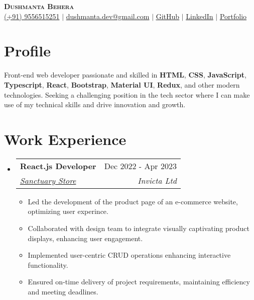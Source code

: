 \documentclass[letterpaper,11pt]{article}
\makeatletter
\newcommand{\resumeItem}[1]{
  \item\small{
    {#1 \vspace{-2pt}}
  }
}
\newcommand{\resumeSubheading}[4]{
  \vspace{-2pt}\item
    \begin{tabular*}{0.97\textwidth}[t]{l@{\extracolsep{\fill}}r}
      \textbf{#1} & #2 \\
      \textit{\small#3} & \textit{\small #4} \\
    \end{tabular*}\vspace{-7pt}
}
\newcommand{\resumeSubHeadingListStart}{\begin{itemize}[leftmargin=0.15in, label={}]}
\newcommand{\resumeSubHeadingListEnd}{\end{itemize}}
\newcommand{\resumeItemListStart}{\begin{itemize}}
\newcommand{\resumeItemListEnd}{\end{itemize}\vspace{-5pt}}
\makeatother
\begin{document}

\begin{center}
   \textbf{\Huge \scshape Dushmanta Behera} \\ \vspace{1pt}
    \small 
    \raisebox{-0.05\height}{\faPhone*} \href{tel:+919556515251}{{(+91) 9556515251}} $|$ 
    \raisebox{-0.05\height}{\faEnvelope} \href{mailto:dushmanta0511@gmail.com}{{dushmanta.dev@gmail.com}} $|$ 
    \raisebox{-0.05\height}{\faGithub} \href{https://github.com/dushmanta05}{{\underline{GitHub}}}
     $|$ 
    \raisebox{-0.05\height}{\faLinkedin} \href{https://www.linkedin.com/in/dushmanta05/}{{\underline{LinkedIn}}}
    $|$ 
    \raisebox{-0.05\height}{\faGlobe} \href{https://dushmanta.is-a.dev/}{{\underline{Portfolio}}}
    
    
\end{center}

\section{Profile}
    
Front-end web developer passionate and skilled in \textbf{HTML}, \textbf{CSS}, \textbf{JavaScript}, \textbf{Typescript}, \textbf{React}, \textbf{Bootstrap}, \textbf{Material UI}, \textbf{Redux}, and other modern technologies. Seeking a challenging position in the tech sector where I can make use of my technical skills and drive innovation and growth.

\section{Work Experience}
  \resumeSubHeadingListStart
  \resumeSubheading
      {React.js Developer}{Dec 2022 - Apr 2023}
      { \href{https://sanctuarystore.co.nz/} {Sanctuary Store}}{Invicta Ltd}
      \resumeItemListStart
       \resumeItem{Led the development of the product page of an e-commerce website, optimizing user experince.}
        \resumeItem{Collaborated with design team to integrate visually captivating product displays, enhancing user engagement.}
         \resumeItem{Implemented user-centric CRUD operations enhancing interactive functionality.}
         \resumeItem{Ensured on-time delivery of project requirements, maintaining efficiency and meeting deadlines.}
    \resumeItemListEnd
  \resumeSubHeadingListEnd

%
\end{document}
